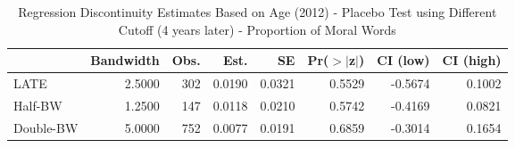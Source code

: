 \begin{table}[ht]
\centering
\begin{tabular}{lrrrrrrr}
  \hline
 & Bandwidth & Obs. & Est. & SE & Pr($>$$|$z$|$) & CI (low) & CI (high) \\ 
  \hline
LATE & 2.5000 & 302 & 0.0190 & 0.0321 & 0.5529 & -0.5674 & 0.1002 \\ 
  Half-BW & 1.2500 & 147 & 0.0118 & 0.0210 & 0.5742 & -0.4169 & 0.0821 \\ 
  Double-BW & 5.0000 & 752 & 0.0077 & 0.0191 & 0.6859 & -0.3014 & 0.1654 \\ 
   \hline
\end{tabular}
\caption{Regression Discontinuity Estimates Based on Age (2012) - Placebo Test using Different Cutoff (4 years later) - Proportion of Moral Words} 
\label{tab:Xrd2012y_plac}
\end{table}
